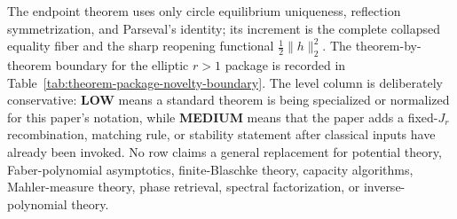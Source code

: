 The endpoint theorem uses only circle equilibrium uniqueness, reflection
symmetrization, and Parseval's identity; its increment is the complete
collapsed equality fiber and the sharp reopening functional
\(\frac12\|h\|_2^2\).  The theorem-by-theorem boundary for the elliptic
\(r>1\) package is recorded in
Table~\ref{tab:theorem-package-novelty-boundary}.  The level column is
deliberately conservative: \textbf{LOW} means a standard theorem is being
specialized or normalized for this paper's notation, while
\textbf{MEDIUM} means that the paper adds a fixed-\(J_r\) recombination,
matching rule, or stability statement after classical inputs have already
been invoked.  No row claims a general replacement for potential theory,
Faber-polynomial asymptotics, finite-Blaschke theory, capacity algorithms,
Mahler-measure theory, phase retrieval, spectral factorization, or
inverse-polynomial theory.
\begingroup
\scriptsize
\renewcommand{\arraystretch}{1.08}
\setlength{\tabcolsep}{2pt}
